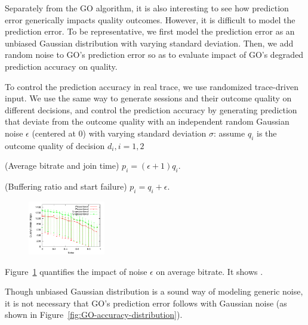 
Separately from the GO algorithm, it is also interesting to see how prediction error generically impacts quality outcomes. However, it is difficult to model the prediction error. To be representative, we first model the prediction error as an unbiased Gaussian distribution with varying standard deviation. Then, we add random noise to GO's prediction error so as to evaluate impact of GO's degraded prediction accuracy on quality.

  To control the prediction accuracy in real trace, we use randomized trace-driven input. We use the same way to generate sessions and their outcome quality on different decisions, and control the prediction accuracy by generating prediction that deviate from the outcome quality with an independent random Gaussian noise $\epsilon$ (centered at 0) with varying standard deviation $\sigma$: assume $q_i$ is the outcome quality of decision $d_i, i=1,2$
\begin{packeditemize}
	\item (Average bitrate and join time) $p_i=(\epsilon+1)q_i$.
	\item (Buffering ratio and start failure) $p_i=q_i+\epsilon$.
\end{packeditemize}


\begin{figure}[h!]
\centering
 \includegraphics[width=0.3\textwidth] {figures/impact/result-noise-impact.pdf}
\label{fig:impact-accuracy}
\end{figure}

Figure~\ref{fig:impact-accuracy} quantifies the impact of noise $\epsilon$ on average bitrate. It shows \fillme.

Though unbiased Gaussian distribution is a sound way of modeling generic noise, it is not necessary that GO's prediction error follows with Gaussian noise (as shown in Figure~\ref{fig:GO-accuracy-distribution}). 


